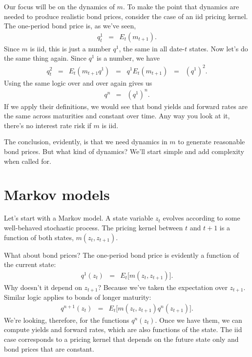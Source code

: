 \documentclass[11pt]{article}
\begin{document}
Our focus will be on the dynamics of $m$.
To make the point that dynamics are needed to produce realistic
bond prices, consider the case of an iid pricing kernel.
The one-period bond price is, as we've seen,
\begin{eqnarray*}
    q^{1}_t &=& E_t \left( m_{t+1} \right) .
\end{eqnarray*}
Since $m$ is iid, this is just a number $q^1$,
the same in all date-$t$ states.
%
Now let's do the same thing again.
Since $q^1 $ is a number, we have
\begin{eqnarray*}
    q^{2}_t &=& E_t \left( m_{t+1} q^1 \right)
            \;\;=\;\;  q^1 E_t \left( m_{t+1}  \right)
            \;\;=\;\;  (q^1)^2 .
\end{eqnarray*}
Using the same logic over and over again gives us
\begin{eqnarray*}
    q^{n} &=& (q^1)^n .
\end{eqnarray*}
If we apply their definitions,
we would see that bond yields and forward rates are the same across maturities
and constant over time.
Any way you look at it, there's no interest rate risk if $m$ is iid.

The conclusion, evidently, is that we need dynamics in $m$
to generate reasonable bond prices.
But what kind of dynamics?
We'll start simple and add complexity when called for.


\section{Markov models}

Let's start with a Markov model.
A state variable $z_t$ evolves according to
some well-behaved stochastic process.
The pricing kernel between $t$ and $t+1$ is a function of both
states, $m (z_t, z_{t+1})$.

What about bond prices?
The one-period bond price is evidently a function of the current state:
\begin{eqnarray*}
    q^1 (z_t) &=& E_t \big[ m(z_t, z_{t+1}) \big] .
\end{eqnarray*}
Why doesn't it depend on $z_{t+1}$?  Because we've taken the expectation
over $z_{t+1}$.
Similar logic applies to bonds of longer maturity:
\begin{eqnarray*}
    q^{n+1} (z_t) &=& E_t \big[ m(z_t, z_{t+1}) q^{n} (z_{t+1}) \big] .
\end{eqnarray*}
We're looking, therefore, for the functions $q^n(z_t)$.
Once we have them, we can compute yields and forward rates, which are also
functions of the state.
The iid case corresponds to a pricing kernel that depends on the future state only
and bond prices that are constant.
\end{document}
